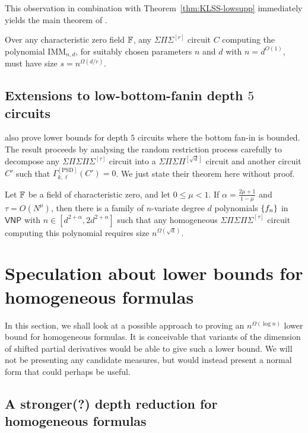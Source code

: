 \documentclass{beatcs}
\newcommand{\IMM}{\mathrm{IMM}}
\newcommand{\SPS}{\Sigma\Pi\Sigma}
\newcommand{\VNP}{\mathsf{VNP}}
\begin{document}
This observation in combination with Theorem~\ref{thm:KLSS-lowsupp} immediately yields the main theorem of \cite{KayalSaha14}. 

\begin{theorem}\label{thm:kaysaha-main}
Over any characteristic zero field $\mathbb{F}$, any $\SPS^{[r]}$ circuit $C$ computing the polynomial $\IMM_{n,d}$, for suitably chosen parameters $n$ and $d$ with $n = d^{O(1)}$, must have size $s = n^{\Omega(d/r)}$. 
\end{theorem}

\subsection{Extensions to low-bottom-fanin depth $5$ circuits}

\cite{KayalSaha14} also prove lower bounds for depth $5$ circuits where the bottom fan-in is bounded. The result proceeds by analysing the random restriction process carefully to decompose any $\Sigma\Pi\Sigma\Pi\Sigma^{[\tau]}$ circuit into a $\Sigma\Pi\Sigma\Pi^{[\sqrt{d}]}$ circuit and another circuit $C'$ such that $\Gamma_{k,\ell}^{[\mathrm{PSD}]}(C') = 0$. We just state their theorem here without proof. 

\begin{theorem}\label{thm:kaysaha-d5}
Let $\mathbb{F}$ be a field of characteristic zero, and let $0\leq \mu < 1$. If $\alpha  = \frac{2\mu + 1}{1 - \mu}$ and $\tau = O(N^\mu)$, then there is a family of $n$-variate degree $d$ polynomials $\left\{f_n\right\}$ in $\VNP$ with $n\in [d^{2+\alpha}, 2d^{2+\alpha}]$ such that any homogeneous $\Sigma\Pi\Sigma\Pi\Sigma^{[\tau]}$ circuit computing this polynomial requires size $n^{\Omega(\sqrt{d})}$. 
\end{theorem}

\section{Speculation about lower bounds for homogeneous formulas}\label{sec:hom-formulas}

In this section, we shall look at a possible approach to proving an $n^{\Omega(\log n)}$ lower bound for homogeneous formulas. It is conceivable that variants of the dimension of shifted partial derivatives would be able to give such a lower bound. We will not be presenting any candidate measures, but would instead present a normal form that could perhaps be useful. 

\subsection{A stronger(?) depth reduction for homogeneous formulas}
\end{document}
